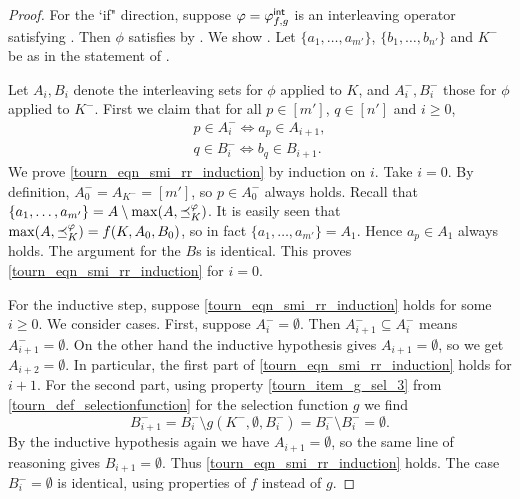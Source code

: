 \begin{proof}
    For the `if" direction, suppose $\varphi = {\varphi_{f, g}^\mathsf{int}}$ is an interleaving
    operator satisfying \smi{}. Then $\phi$ satisfies
    \chaindef{} by . We
    show \rankremoval{}. Let $\{a_1, \ldots, a_{m'}\}$, $\{b_1,
    \ldots, b_{n'}\}$ and $K^-$ be as in the statement of
    \rankremoval{}.

    Let $A_i, B_i$ denote the interleaving sets for $\phi$ applied to $K$, and
    $A^-_i, B^-_i$ those for $\phi$ applied to $K^-$. First we claim that for
    all $p \in [m']$, $q \in [n']$ and $i \ge 0$,
    \begin{equation}
        \label{tourn_eqn_smi_rr_induction}
        \begin{split}
            p \in A^-_i \iff a_p \in A_{i + 1}, \\
            q \in B^-_i \iff b_q \in B_{i + 1}.
        \end{split}
    \end{equation}
    We prove \cref{tourn_eqn_smi_rr_induction} by induction on $i$. Take
    $i = 0$. By definition, $A^-_0 = A_{K^-} = [m']$, so $p \in A^-_0$ always
    holds. Recall that $\{a_1, \ldots, a_{m'}\} = A \setminus \max(A,
    {\preceq_K^\varphi})$. It is easily seen that $\max(A, {\preceq_K^\varphi}) = f(K, A_0,
    B_0)$, so in fact $\{a_1, \ldots, a_{m'}\} = A_1$. Hence $a_p \in A_1$
    always holds. The argument for the $B$s is identical. This proves
    \cref{tourn_eqn_smi_rr_induction} for $i = 0$.

    For the inductive step, suppose \cref{tourn_eqn_smi_rr_induction}
    holds for some $i \ge 0$. We consider cases. First, suppose $A^-_i =
    \emptyset$. Then $A^-_{i + 1} \subseteq A^-_i$ means $A^-_{i + 1} =
    \emptyset$. On the other hand the inductive hypothesis gives $A_{i + 1} =
    \emptyset$, so we get $A_{i + 2} = \emptyset$. In particular, the first
    part of \cref{tourn_eqn_smi_rr_induction} holds for $i + 1$. For the
    second part, using property \cref{tourn_item_g_sel_3} from
    \cref{tourn_def_selectionfunction} for the selection function $g$ we find
    \[
        B^-_{i + 1}
        = B^-_i \setminus g(K^-, \emptyset, B^-_i)
        = B^-_i \setminus B^-_i
        = \emptyset.
    \]
    By the inductive hypothesis again we have $A_{i + 1} = \emptyset$, so the
    same line of reasoning gives $B_{i + 1} = \emptyset$. Thus
    \cref{tourn_eqn_smi_rr_induction} holds. The case $B^-_i = \emptyset$
    is identical, using properties of $f$ instead of $g$.


\end{proof}
